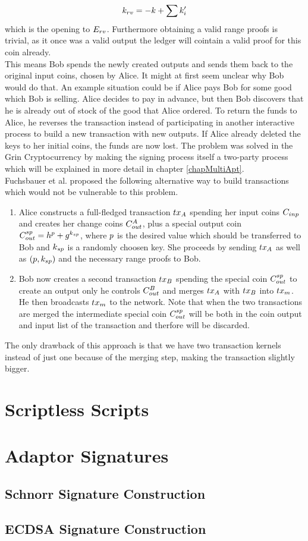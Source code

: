 \[ k_{rv} = -k + \sum{k'_i} \]
which is the opening to $E_{rv}$. Furthermore obtaining a valid range proofs is trivial, as it once was a valid output the ledger will cointain a valid proof for this coin already. \\
This means Bob spends the newly created outputs and sends them back to the original input coins, chosen by Alice. It might at first seem unclear why Bob would do that. An example situation could be if Alice
pays Bob for some good which Bob is selling. Alice decides to pay in advance, but then Bob discovers that he is already out of stock of the good that Alice ordered. To return the funds to Alice, he reverses
the transaction instead of participating in another interactive process to build a new transaction with new outputs. If Alice already deleted the keys to her initial coins, the funds are now lost.
The problem was solved in the Grin Cryptocurrency by making the signing process itself a two-party process which will be explained in more detail in chapter \ref{chapMultiApt}. \\

Fuchsbauer et al. \cite{fuchsbauer2019aggregate} proposed the following alternative way to build transactions which would not be vulnerable to this problem.
\begin{enumerate}
    \item Alice constructs a full-fledged transaction $tx_A$ spending her input coins $C_{inp}$ and creates her change coins $C_{out}^A$, plus a special output coin $C_{out}^{sp} = h^{p} + g^{k_{sp}}$,
    where $p$ is the desired value which should be transferred to Bob and $k_{sp}$ is a randomly choosen key. She proceeds by sending $tx_A$ as well as $(p, k_{sp})$ and the necessary range
    proofs to Bob.
    \item Bob now creates a second transaction $tx_B$ spending the special coin $C_{out}^{sp}$ to create an output only he controls $C_{out}^{B}$ and merges $tx_A$ with $tx_B$
    into $tx_m$. He then broadcasts $tx_m$ to the network. Note that when the two transactions are merged the intermediate special coin $C_{out}^{sp}$ will be both in the coin output and input list
    of the transaction and therfore will be discarded.
\end{enumerate}
The only drawback of this approach is that we have two transaction kernels instead of just one because of the merging step, making the transaction slightly bigger.

\section{Scriptless Scripts}\label{secScriptless}
\section{Adaptor Signatures}\label{secApt}
\subsection{Schnorr Signature Construction}\label{secAptSchnorr}
\subsection{ECDSA Signature Construction}\label{secAptECDSA}
